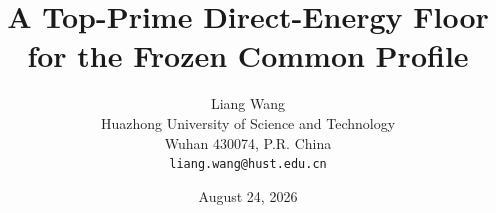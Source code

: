 \documentclass[11pt]{article}
\title{\textbf{A Top-Prime Direct-Energy Floor\\
for the Frozen Common Profile}}
\author{Liang Wang\\
\small Huazhong University of Science and Technology\\
\small Wuhan 430074, P.R. China\\
\small \texttt{liang.wang@hust.edu.cn}}
\date{August 24, 2026}
\theoremstyle{definition}
\theoremstyle{remark}
\begin{document}
\maketitle

\begin{abstract}

\end{abstract}












\appendix

\end{document}
